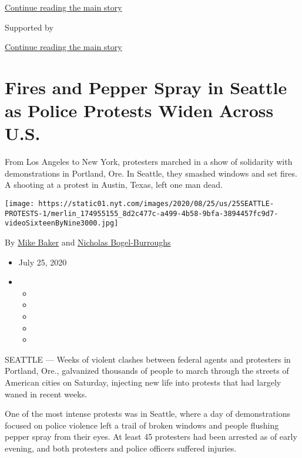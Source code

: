 \protect\hyperlink{after-top}{Continue reading the main story}

Supported by

\protect\hyperlink{after-sponsor}{Continue reading the main story}

\hypertarget{fires-and-pepper-spray-in-seattle-as-police-protests-widen-across-us}{%
\section{Fires and Pepper Spray in Seattle as Police Protests Widen
Across
U.S.}\label{fires-and-pepper-spray-in-seattle-as-police-protests-widen-across-us}}

From Los Angeles to New York, protesters marched in a show of solidarity
with demonstrations in Portland, Ore. In Seattle, they smashed windows
and set fires. A shooting at a protest in Austin, Texas, left one man
dead.

\texttt{[image: https://static01.nyt.com/images/2020/08/25/us/25SEATTLE-PROTESTS-1/merlin\_174955155\_8d2c477c-a499-4b58-9bfa-3894457fc9d7-videoSixteenByNine3000.jpg]}

By \href{https://www.nytimes.com/by/mike-baker}{Mike Baker} and
\href{https://www.nytimes.com/by/nicholas-bogel-burroughs}{Nicholas
Bogel-Burroughs}

\begin{itemize}
\item
  July 25, 2020
\item
  \begin{itemize}
  \item
  \item
  \item
  \item
  \item
  \end{itemize}
\end{itemize}

SEATTLE --- Weeks of violent clashes between federal agents and
protesters in Portland, Ore., galvanized thousands of people to march
through the streets of American cities on Saturday, injecting new life
into protests that had largely waned in recent weeks.

One of the most intense protests was in Seattle, where a day of
demonstrations focused on police violence left a trail of broken windows
and people flushing pepper spray from their eyes. At least 45 protesters
had been arrested as of early evening, and both protesters and police
officers suffered injuries.

